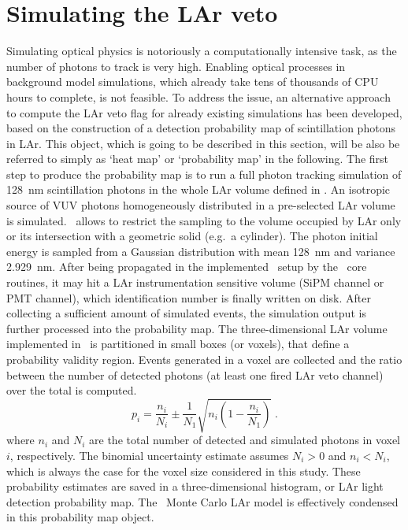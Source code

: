 \section{Simulating the LAr veto}%
\label{sec:bkg:lar:ph2:heatmap}

Simulating optical physics is notoriously a computationally intensive task, as the number
of photons to track is very high. Enabling optical processes in background model
simulations, which already take tens of thousands of CPU hours to complete, is not
feasible. To address the issue, an alternative approach to compute the LAr veto flag for
already existing simulations has been developed, based on the construction of a detection
probability map of scintillation photons in LAr. This object, which is going to be
described in this section, will be also be referred to simply as `heat map' or
`probability map' in the following.
\newpar
The first step to produce the probability map is to run a full photon tracking simulation
of 128~nm scintillation photons in the whole LAr volume defined in \mage. An isotropic
source of VUV photons homogeneously distributed in a pre-selected LAr volume is simulated.
\mage\ allows to restrict the sampling to the volume occupied by LAr only or its
intersection with a geometric solid (e.g.~a cylinder). The photon initial energy is
sampled from a Gaussian distribution with mean 128~nm and variance 2.929~nm. After being
propagated in the implemented \gerda\ setup by the \geant\ core routines, it may hit a
LAr instrumentation sensitive volume (SiPM channel or PMT channel), which identification
number is finally written on disk. After collecting a sufficient amount of simulated
events, the simulation output is further processed into the probability map. The
three-dimensional LAr volume implemented in \mage\ is partitioned in small boxes (or voxels),
that define a probability validity region. Events generated in a voxel are collected and
the ratio between the number of detected photons (at least one fired LAr veto channel)
over the total is computed.
\[
  p_i = \frac{n_i}{N_i} \pm \frac{1}{N_1}\sqrt{n_i \left(1 - \frac{n_i}{N_1} \right)} \;.
\]
where $n_i$ and $N_i$ are the total number of detected and simulated photons in voxel $i$,
respectively. The binomial uncertainty estimate assumes $N_i>0$ and $n_i<N_i$, which is
always the case for the voxel size considered in this study.  These probability estimates
are saved in a three-dimensional histogram, or LAr light detection probability map. The
\gerda\ Monte Carlo LAr model is effectively condensed in this probability map object.
